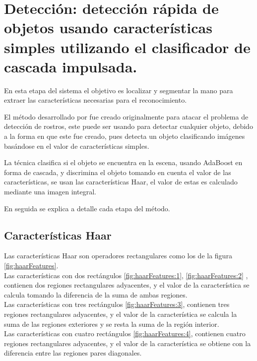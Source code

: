  
\section{Detección: detección rápida de objetos usando características simples utilizando el clasificador de cascada impulsada.}\label{sec:ViolaJones}

En esta etapa del sistema el objetivo es localizar y segmentar la mano para extraer las características necesarias para el reconocimiento. 

El m\'etodo  desarrollado por \citep{Viola2001} fue creado originalmente para atacar el problema de detección de rostros, este puede ser usando para detectar cualquier objeto, debido a la forma en que este fue creado, pues detecta un objeto clasificando imágenes basándose en el valor de características simples.

La técnica clasifica si el objeto se encuentra en la escena, usando AdaBoost en forma de cascada, y discrimina el objeto tomando en cuenta el valor de las características, se usan las características Haar, el valor de estas es calculado mediante una imagen integral.

En seguida se explica a detalle cada etapa del método. 

\subsection{Características Haar}\label{subsec:CaracteristicasHaar}  

Las características Haar son operadores rectangulares como los de la figura \ref{fig:haarFeatures}.\\ 
Las características con dos rectángulos \ref{fig:haarFeatures:1}, \ref{fig:haarFeatures:2} , contienen dos regiones rectangulares adyacentes, y el valor de la característica se calcula tomando la diferencia de la suma de ambas regiones.\\ 
Las características con tres rectángulos \ref{fig:haarFeatures:3}, contienen tres regiones rectangulares adyacentes, y el valor de la característica se calcula la suma de las regiones exteriores y se resta la suma de la región interior.\\ 
Las características con cuatro rectángulos \ref{fig:haarFeatures:4}, contienen cuatro regiones rectangulares adyacentes, y el valor de la característica se obtiene con la diferencia entre las regiones pares diagonales.


